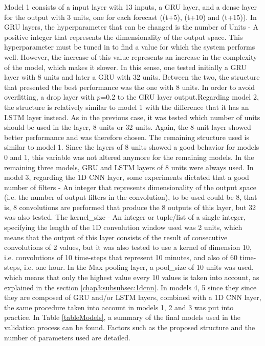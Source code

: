 Model 1 consists of a input layer with 13 inputs, a \ac{GRU} layer, and a dense layer for the output with 3 units, one for each forecast ((t+5), (t+10) and (t+15)). In \ac{GRU} layers, the hyperparameter that can be changed is the number of Units - A positive integer that represents the dimensionality of the output space. This hyperparameter must be tuned in to find a value for which the system performs well. However, the increase of this value represents an increase in the complexity of the model, which makes it slower.  In this sense, one tested initially a \ac{GRU} layer with 8 units and later a \ac{GRU} with 32 units. Between the two, the structure that presented the best performance was the one with 8 units. In order to avoid overfitting, a drop layer with $p$=0.2 to the \ac{GRU} layer output.Regarding model 2, the structure is relatively similar to model 1 with the difference that it has an \ac{LSTM} layer instead. As in the previous case, it was tested which number of units should be used in the layer, 8 units or 32 units.  Again, the 8-unit layer showed better performance and was therefore chosen. The remaining structure used is similar to model 1. Since the layers of 8 units showed a good behavior for models 0 and 1, this variable was not altered anymore for the remaining models. In the remaining three models, \ac{GRU} and \ac{LSTM} layers of 8 units were always used. In model 3, regarding the \ac{1D CNN} layer, some experiments dictated that a good number of filters - An integer that represents dimensionality of the output space (i.e. the number of output filters in the convolution), to be used could be 8, that is, 8 convolutions are performed that produce the 8 outputs of this layer, but 32 was also tested. The kernel\_size - An integer or tuple/list of a single integer, specifying the length of the 1D convolution window used was 2 units, which means that the output of this layer consists of the result of consecutive convolutions of 2 values, but it was also tested to use a kernel of dimension 10, i.e. convolutions of 10 time-steps that represent 10 minutes, and also of 60 time-steps, i.e. one hour. In the Max pooling layer, a pool\_size of 10 units was used, which means that only the highest value every 10 values is taken into account, as explained in the section \ref{chap3:subsubsec:1dcnn}. In models 4, 5 since they since they are composed of \ac{GRU} and/or \ac{LSTM} layers, combined with a \ac{1D CNN} layer, the same procedure taken into account in models 1, 2 and 3 was put into practice. In Table \ref{tableModels}, a summary of the final models used in the validation process can be found. Factors such as the proposed structure and the number of parameters used are detailed.

